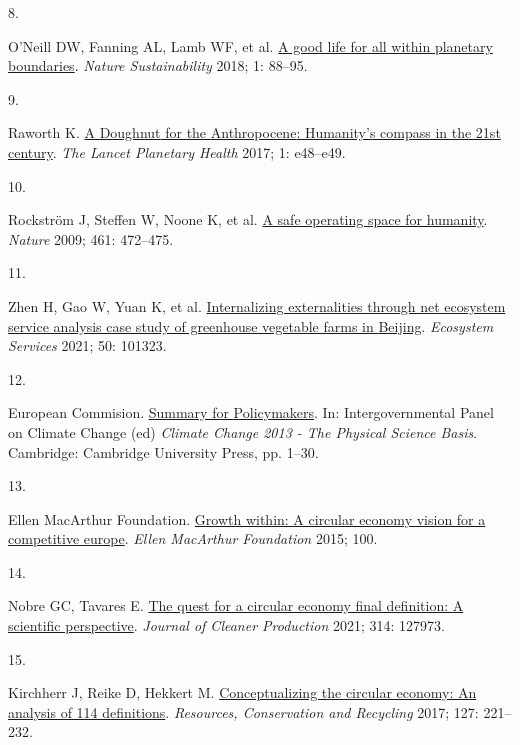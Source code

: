 \documentclass[
  11pt,
  a4paperpaper,
  onecolumn]{article}
\newlength{\cslhangindent}
\newlength{\csllabelwidth}
\newlength{\cslentryspacingunit} %
\newenvironment{CSLReferences}[2] %
 {%
  \setlength{\parindent}{0pt}
  \ifodd #1
  \let\oldpar\par
  \def\par{\hangindent=\cslhangindent\oldpar}
  \fi
  \setlength{\parskip}{#2\cslentryspacingunit}
 }%
 {}
\newcommand{\CSLLeftMargin}[1]{\parbox[t]{\csllabelwidth}{#1}}
\newcommand{\CSLRightInline}[1]{\parbox[t]{\linewidth - \csllabelwidth}{#1}\break}
\begin{document}
\begin{CSLReferences}{0}{0}
\leavevmode{}%
\CSLLeftMargin{8. }%
\CSLRightInline{O'Neill DW, Fanning AL, Lamb WF, et al.
\href{https://doi.org/10.1038/s41893-018-0021-4}{A good life for all
within planetary boundaries}. \emph{Nature Sustainability} 2018; 1:
88--95.}

\leavevmode{}%
\CSLLeftMargin{9. }%
\CSLRightInline{Raworth K.
\href{https://doi.org/10.1016/S2542-5196(17)30028-1}{A {Doughnut} for
the {Anthropocene}: Humanity's compass in the 21st century}. \emph{The
Lancet Planetary Health} 2017; 1: e48--e49.}

\leavevmode{}%
\CSLLeftMargin{10. }%
\CSLRightInline{Rockström J, Steffen W, Noone K, et al.
\href{https://doi.org/10.1038/461472a}{A safe operating space for
humanity}. \emph{Nature} 2009; 461: 472--475.}

\leavevmode{}%
\CSLLeftMargin{11. }%
\CSLRightInline{Zhen H, Gao W, Yuan K, et al.
\href{https://doi.org/10.1016/j.ecoser.2021.101323}{Internalizing
externalities through net ecosystem service analysis\textendash{{A}}
case study of greenhouse vegetable farms in {Beijing}}. \emph{Ecosystem
Services} 2021; 50: 101323.}

\leavevmode{}%
\CSLLeftMargin{12. }%
\CSLRightInline{European Commision.
\href{https://doi.org/10.1017/CBO9781107415324.004}{Summary for
{Policymakers}}. In: Intergovernmental Panel on Climate Change (ed)
\emph{Climate {Change} 2013 - {The Physical Science Basis}}.
{Cambridge}: {Cambridge University Press}, pp. 1--30.}

\leavevmode{}%
\CSLLeftMargin{13. }%
\CSLRightInline{Ellen MacArthur Foundation.
\href{https://doi.org/Article}{Growth within: A circular economy vision
for a competitive europe}. \emph{Ellen MacArthur Foundation} 2015; 100.}

\leavevmode{}%
\CSLLeftMargin{14. }%
\CSLRightInline{Nobre GC, Tavares E.
\href{https://doi.org/10.1016/j.jclepro.2021.127973}{The quest for a
circular economy final definition: {A} scientific perspective}.
\emph{Journal of Cleaner Production} 2021; 314: 127973.}

\leavevmode{}%
\CSLLeftMargin{15. }%
\CSLRightInline{Kirchherr J, Reike D, Hekkert M.
\href{https://doi.org/10.1016/j.resconrec.2017.09.005}{Conceptualizing
the circular economy: {An} analysis of 114 definitions}.
\emph{Resources, Conservation and Recycling} 2017; 127: 221--232.}


\end{CSLReferences}
\end{document}
